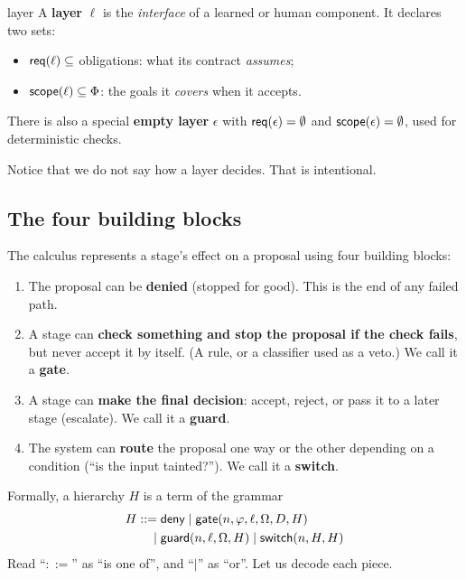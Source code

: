 \begin{defbox}{layer}
A \textbf{layer} $\ell$ is the \emph{interface} of a learned or human component. It declares two sets:
\begin{itemize}
\item $\mathsf{req}(\ell)\subseteq$ obligations: what its contract \emph{assumes};
\item $\mathsf{scope}(\ell)\subseteq\Phi$: the goals it \emph{covers} when it accepts.
\end{itemize}
There is also a special \textbf{empty layer} $\epsilon$ with $\mathsf{req}(\epsilon)=\emptyset$ and $\mathsf{scope}(\epsilon)=\emptyset$, used for deterministic checks.
\end{defbox}

Notice that we do not say how a layer decides. That is intentional.

\subsection{The four building blocks}

The calculus represents a stage's effect on a proposal using four building blocks:

\begin{enumerate}
\item The proposal can be \textbf{denied} (stopped for good). This is the end of any failed path.
\item A stage can \textbf{check something and stop the proposal if the check fails}, but never accept it by itself. (A rule, or a classifier used as a veto.) We call it a \textbf{gate}.
\item A stage can \textbf{make the final decision}: accept, reject, or pass it to a later stage (escalate). We call it a \textbf{guard}.
\item The system can \textbf{route} the proposal one way or the other depending on a condition (``is the input tainted?''). We call it a \textbf{switch}.
\end{enumerate}

Formally, a hierarchy $H$ is a term of the grammar
\begin{align*}
H ::={}& \mathsf{deny} \mid \mathsf{gate}(n,\varphi,\ell,\Omega,D,H)\\
\mid{}& \mathsf{guard}(n,\ell,\Omega,H) \mid \mathsf{switch}(n,H,H)
\end{align*}
Read ``$::=$'' as ``is one of'', and ``$\mid$'' as ``or''. Let us decode each piece.

